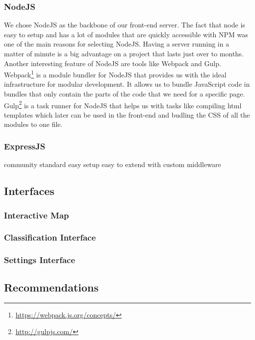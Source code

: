\subsubsection{NodeJS}
We chose NodeJS as the backbone of our front-end server. The fact that node is easy to setup and has a lot of modules that are quickly accessible with NPM was one of the main reasons for selecting NodeJS. Having a server running in a matter of minute is a big advantage on a project that lasts just over to months.\\
Another interesting feature of NodeJS are tools like Webpack and Gulp. Webpack\footnote{\url{https://webpack.js.org/concepts/}} is a module bundler for NodeJS that provides us with the ideal infrastructure for modular development. It allows us to bundle JavaScript code in bundles that only contain the parts of the code that we need for a specific page. Gulp\footnote{\url{http://gulpjs.com/}} is a task runner for NodeJS that helps us with tasks like compiling html templates which later can be used in the front-end and budling the CSS of all the modules to one file.
\subsubsection{ExpressJS}
community standard
easy setup
easy to extend with custom middleware

\subsection{Interfaces}
\subsubsection{Interactive Map}
\subsubsection{Classification Interface}
\subsubsection{Settings Interface}

\subsection{Recommendations}